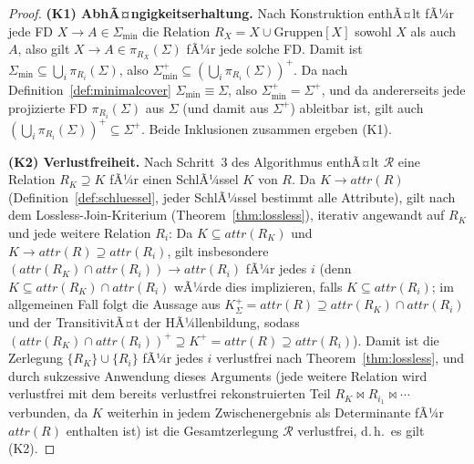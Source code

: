 ﻿\documentclass[a4paper,12pt]{report}
\theoremstyle{definition}
\theoremstyle{remark}
\newcommand{\att}{\mathit{attr}}
\begin{document}
\begin{proof}
\textbf{(K1) AbhÃ¤ngigkeitserhaltung.}
Nach Konstruktion enthÃ¤lt fÃ¼r jede FD $X\to A\in\Sigma_{\min}$ die
Relation $R_X=X\cup\text{Gruppen}[X]$ sowohl $X$ als auch $A$, also
gilt $X\to A \in \pi_{R_X}(\Sigma)$ fÃ¼r jede solche FD. Damit ist
$\Sigma_{\min}\subseteq\bigcup_i\pi_{R_i}(\Sigma)$, also
$\Sigma_{\min}^+\subseteq(\bigcup_i\pi_{R_i}(\Sigma))^+$. Da nach
Definition~\ref{def:minimalcover} $\Sigma_{\min}\equiv\Sigma$, also
$\Sigma_{\min}^+=\Sigma^+$, und da andererseits jede projizierte FD
$\pi_{R_i}(\Sigma)$ aus $\Sigma$ (und damit aus $\Sigma^+$) ableitbar
ist, gilt auch
$(\bigcup_i\pi_{R_i}(\Sigma))^+\subseteq\Sigma^+$. Beide Inklusionen
zusammen ergeben (K1).

\textbf{(K2) Verlustfreiheit.}
Nach Schritt~3 des Algorithmus enthÃ¤lt $\mathcal{R}$ eine Relation
$R_K\supseteq K$ fÃ¼r einen SchlÃ¼ssel $K$ von $R$. Da $K\to\att(R)$
(Definition~\ref{def:schluessel}, jeder SchlÃ¼ssel bestimmt alle
Attribute), gilt nach dem Lossless-Join-Kriterium
(Theorem~\ref{thm:lossless}), iterativ angewandt auf
$R_K$ und jede weitere Relation $R_i$: Da $K\subseteq\att(R_K)$ und
$K\to\att(R)\supseteq\att(R_i)$, gilt insbesondere
$(\att(R_K)\cap\att(R_i))\to\att(R_i)$ fÃ¼r jedes $i$ (denn
$K\subseteq\att(R_K)\cap\att(R_i)$ wÃ¼rde dies implizieren, falls
$K\subseteq \att(R_i)$; im allgemeinen Fall folgt die Aussage aus
$K^+_\Sigma=\att(R)\supseteq \att(R_K)\cap\att(R_i)$ und der
TransitivitÃ¤t der HÃ¼llenbildung, sodass
$(\att(R_K)\cap\att(R_i))^+\supseteq K^+=\att(R)\supseteq\att(R_i)$).
Damit ist die Zerlegung $\{R_K\}\cup\{R_i\}$ fÃ¼r jedes $i$ verlustfrei
nach Theorem~\ref{thm:lossless}, und durch sukzessive Anwendung dieses
Arguments (jede weitere Relation wird verlustfrei mit dem bereits
verlustfrei rekonstruierten Teil $R_K\Join R_{i_1}\Join\cdots$
verbunden, da $K$ weiterhin in jedem Zwischenergebnis als
Determinante fÃ¼r $\att(R)$ enthalten ist) ist die Gesamtzerlegung
$\mathcal{R}$ verlustfrei, d.\,h.\ es gilt (K2).


\end{proof}
\end{document}
